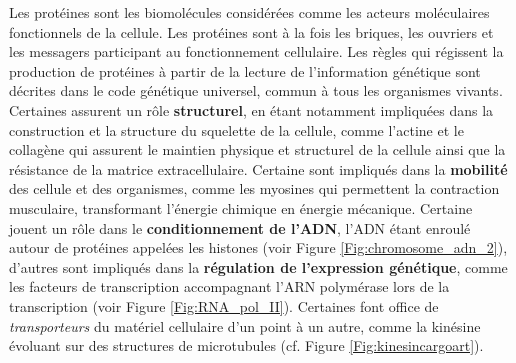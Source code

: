 Les protéines sont les biomolécules considérées comme les acteurs moléculaires fonctionnels de la cellule. Les protéines sont à la fois les briques, les ouvriers et les messagers participant au fonctionnement cellulaire. Les règles qui régissent la production de protéines à partir de la lecture de l'information génétique sont décrites dans le code génétique universel, commun à tous les organismes vivants. Certaines assurent un rôle \textbf{structurel}, en étant notamment impliquées dans la construction et la structure du squelette de la cellule, comme l'actine et le collagène qui assurent le maintien physique et structurel de la cellule ainsi que la résistance de la matrice extracellulaire. Certaine sont impliqués dans la \textbf{mobilité} des cellule et des organismes, comme les myosines qui permettent la contraction musculaire, transformant l'énergie chimique en énergie mécanique. Certaine jouent un rôle dans le \textbf{conditionnement de l'ADN}, l'ADN étant enroulé autour de protéines appelées les histones (voir Figure \ref{Fig:chromosome_adn_2}), d'autres sont impliqués dans la \textbf{régulation de l'expression génétique}, comme les facteurs de transcription accompagnant l'ARN polymérase lors de la transcription (voir Figure \ref{Fig:RNA_pol_II}). Certaines font office de \textit{transporteurs} du matériel cellulaire d'un point à un autre, comme la kinésine évoluant sur des structures de microtubules (cf. Figure \ref{Fig:kinesincargoart}).

